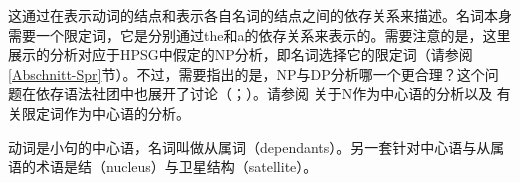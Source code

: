 这通过在表示动词的结点和表示各自名词的结点之间的依存关系来描述。名词本身需要一个限定词，它是分别通过the和a的依存关系来表示的。需要注意的是，这里展示的分析对应于HPSG中假定的NP分析，即名词选择它的限定词（请参阅\ref{Abschnitt-Spr}节）。不过，需要指出的是，NP与DP分析哪一个更合理？这个问题在依存语法社团中也展开了讨论（\citealp[]{Hudson84a-u}；\citealp{vanLangendonck94a,Hudson2004a}）。请参阅 \citet{Engel77}关于N作为中心语的分析以及 \citet[]{Welke2011a-u}有关限定词作为中心语的分析。

动词是小句的中心语，名词叫做从属词（dependants）。另一套针对中心语与从属语的术语是结（nucleus）与卫星结构（satellite）。

